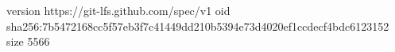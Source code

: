 version https://git-lfs.github.com/spec/v1
oid sha256:7b5472168cc5f57eb3f7c41449dd210b5394e73d4020ef1ccdecf4bdc6123152
size 5566
